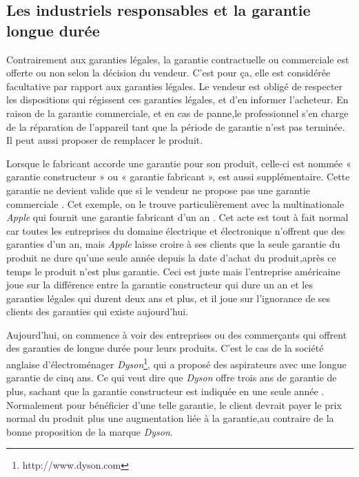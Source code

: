\subsection{Les industriels responsables et la garantie longue durée}


\smallbreak
Contrairement aux garanties légales, la garantie contractuelle ou commerciale est offerte ou non selon la décision du vendeur. C'est pour ça, elle est considérée facultative par rapport aux garanties légales. Le vendeur est obligé de respecter les dispositions qui régissent ces garanties légales, et d'en informer l'acheteur. 
En raison de la garantie commerciale, et en cas de panne,le professionnel s’en charge de la réparation de l’appareil tant que la période de garantie n'est pas terminée. Il peut aussi proposer de remplacer le produit.


\smallbreak
Lorsque le fabricant accorde une garantie pour son produit, celle-ci est nommée « garantie constructeur » ou « garantie fabricant », est aussi supplémentaire. Cette garantie ne devient valide que si le vendeur ne propose pas une garantie commerciale \cite{loigarantie}.
\smallbreak
Cet exemple, on le trouve particulièrement avec la multinationale \textit{Apple} qui fournit une garantie fabricant d’un an \cite{apple}. Cet acte est tout à fait normal car toutes les entreprises du domaine électrique et électronique n'offrent que des garanties d’un an, mais \textit{Apple} laisse croire à ses clients que la seule garantie du produit ne dure qu'une seule année depuis la date d'achat du produit,après ce temps le produit n'est plus garantie. Ceci est juste mais l'entreprise américaine joue sur la différence entre la garantie constructeur qui dure un an et les garanties légales qui durent deux ans et plus, et il joue sur l'ignorance de ses clients des garanties qui existe aujourd'hui.


\smallbreak
Aujourd'hui, on commence à voir des entreprises ou des commerçants qui offrent des garanties de longue durée pour leurs produits.
\smallbreak C'est le cas de la société anglaise d’électroménager \textit{Dyson}\footnote{http://www.dyson.com}, qui a proposé des aspirateurs avec une longue garantie de cinq ans. Ce qui veut dire que \textit{Dyson} offre trois ans de garantie de plus, sachant que la garantie constructeur est indiquée en une seule année \cite{dyson}. Normalement pour bénéficier d'une telle garantie, le client devrait payer le prix normal du produit plus une augmentation liée à la garantie,au contraire de la bonne proposition de la marque \textit{Dyson}.


